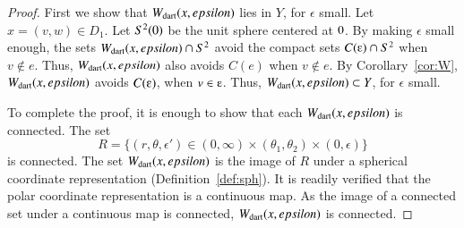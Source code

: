 \begin{proof}  First we show that $W_{\text{dart}}(x,epsilon)$ lies in $Y$,
for $\epsilon$ small.  Let $x=(v,w)\in D_1$.  
Let $S^2(0)$ be the unit sphere centered at $0$.
By making $\epsilon$ small enough,
the sets $W_{\text{dart}}(x,epsilon)\cap S^2$
avoid the compact sets $C(\e)\cap S^2$ when $v\not\in e$.
Thus, $W_{\text{dart}}(x,epsilon)$ also avoids $C(e)$ when $v\not\in e$.
By Corollary~\ref{cor:W}, $W_{\text{dart}}(x,epsilon)$ avoids $C(\e)$, when $v\in \e$.
Thus, $W_{\text{dart}}(x,epsilon)\subset Y$, for $\epsilon$ small.

To complete the proof, it is enough to show that each $W_{\text{dart}}(x,epsilon)$ is
connected.  
The  set
   $$
   R=\{(r,\theta,\epsilon') \in (0,\infty) \times (\theta_1,\theta_2) \times (0,\epsilon)\}
   $$
is connected.
The set $W_{\text{dart}}(x,epsilon)$  is the image of $R$
under a spherical coordinate representation (Definition~\ref{def:sph}).
It is readily verified that the polar coordinate representation is
a continuous map. As the image of a connected set under a continuous map
is connected, $W_{\text{dart}}(x,epsilon)$ is connected.
\end{proof}


